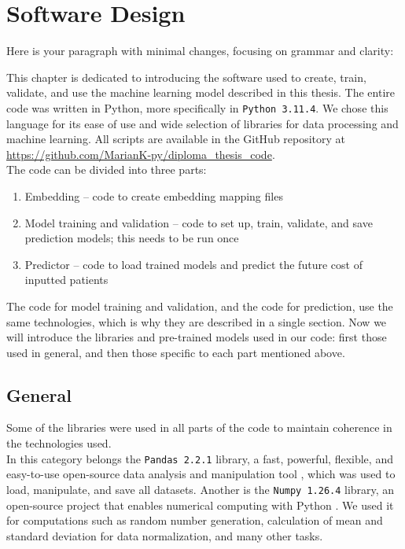 
\chapter{Software Design} \label{chap:softwaredesign}

Here is your paragraph with minimal changes, focusing on grammar and clarity:

This chapter is dedicated to introducing the software used to create, train, validate, and use the machine learning model described in this thesis. The entire code was written in Python, more specifically in \texttt{Python 3.11.4}. We chose this language for its ease of use and wide selection of libraries for data processing and machine learning. All scripts are available in the GitHub repository at \url{https://github.com/MarianK-py/diploma_thesis_code}.
\\

The code can be divided into three parts:

\begin{enumerate}
	\item Embedding – code to create embedding mapping files
	\item Model training and validation – code to set up, train, validate, and save prediction models; this needs to be run once
	\item Predictor – code to load trained models and predict the future cost of inputted patients
\end{enumerate}

The code for model training and validation, and the code for prediction, use the same technologies, which is why they are described in a single section. Now we will introduce the libraries and pre-trained models used in our code: first those used in general, and then those specific to each part mentioned above.

\section{General}

Some of the libraries were used in all parts of the code to maintain coherence in the technologies used.
\\

In this category belongs the \texttt{Pandas 2.2.1} library, a fast, powerful, flexible, and easy-to-use open-source data analysis and manipulation tool \cite{pandas}, which was used to load, manipulate, and save all datasets. Another is the \texttt{Numpy 1.26.4} library, an open-source project that enables numerical computing with Python \cite{numpy}. We used it for computations such as random number generation, calculation of mean and standard deviation for data normalization, and many other tasks.



